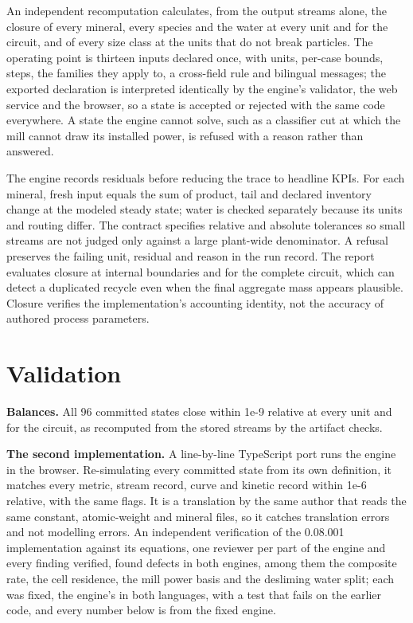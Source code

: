 \documentclass[10pt]{article}
\begin{document}
An independent recomputation calculates, from the output streams alone,
the closure of every mineral, every species and the water at every unit
and for the circuit, and of every size class at the units that do not
break particles. The operating point is thirteen inputs declared once,
with units, per-case bounds, steps, the families they apply to, a
cross-field rule and bilingual messages; the exported declaration is
interpreted identically by the engine's validator, the web service and
the browser, so a state is accepted or rejected with the same code
everywhere. A state the engine cannot solve, such as a classifier cut at
which the mill cannot draw its installed power, is refused with a reason
rather than answered.

The engine records residuals before reducing the trace to headline KPIs.
For each mineral, fresh input equals the sum of product, tail and
declared inventory change at the modeled steady state; water is checked
separately because its units and routing differ. The contract specifies
relative and absolute tolerances so small streams are not judged only
against a large plant-wide denominator. A refusal preserves the failing
unit, residual and reason in the run record. The report evaluates
closure at internal boundaries and for the complete circuit, which can
detect a duplicated recycle even when the final aggregate mass appears
plausible. Closure verifies the implementation's accounting identity,
not the accuracy of authored process parameters.

\section{Validation}\label{validation}

\textbf{Balances.} All 96 committed states close within 1e-9 relative at
every unit and for the circuit, as recomputed from the stored streams by
the artifact checks.

\textbf{The second implementation.} A line-by-line TypeScript port runs
the engine in the browser. Re-simulating every committed state from its
own definition, it matches every metric, stream record, curve and
kinetic record within 1e-6 relative, with the same flags. It is a
translation by the same author that reads the same constant,
atomic-weight and mineral files, so it catches translation errors and
not modelling errors. An independent verification of the 0.08.001
implementation against its equations, one reviewer per part of the
engine and every finding verified, found defects in both engines, among
them the composite rate, the cell residence, the mill power basis and
the desliming water split; each was fixed, the engine's in both
languages, with a test that fails on the earlier code, and every number
below is from the fixed engine.
\end{document}
